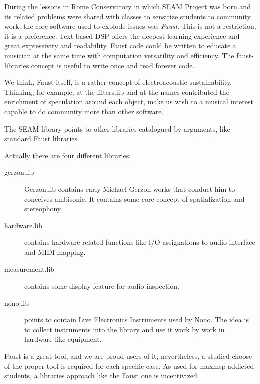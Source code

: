 \documentclass[twoside,a4paper]{article}
\begin{document}

During the lessons in Rome Conservatory in which SEAM Project was born and its related problems were shared with classes to sensitize students to community work, the core software used to explode issues was \emph{Faust}. This is not a restriction, it is a preference. Text-based DSP offers the deepest learning experience and great expressivity and readability. Faust code could be written to educate a musician at the same time with computation versatility and efficiency. The faust-libraries concept is useful to write once and read forever code.

We think, Faust itself, is a rather concept of electroacoustic sustainability. Thinking, for example, at the filters.lib and at the names contributed the enrichment of speculation around each object, make us wish to a musical interest capable to do community more than other software. 

The SEAM library points to other libraries catalogued by arguments, like standard Faust libraries. 

Actually there are four different libraries:
\begin{description}
\item[gerzon.lib] Gerzon.lib contains early Michael Gerzon works that conduct him to conceives ambisonic. It contains some core concept of spatialization and stereophony. 
\item[hardware.lib] contains hardware-related functions like I/O assignations to audio interface and MIDI mapping.
\item[measurement.lib] contains some display feature for audio inspection.
\item[nono.lib] points to contain Live Electronics Instruments used by Nono. The idea is to collect instruments into the library and use it work by work in hardware-like equipment. 
\end{description}

Faust is a great tool, and we are proud users of it, nevertheless, a studied choose of the proper tool is required for each specific case. As used for maxmsp addicted students, a libraries approach like the Faust one is incentivized.
\end{document}
